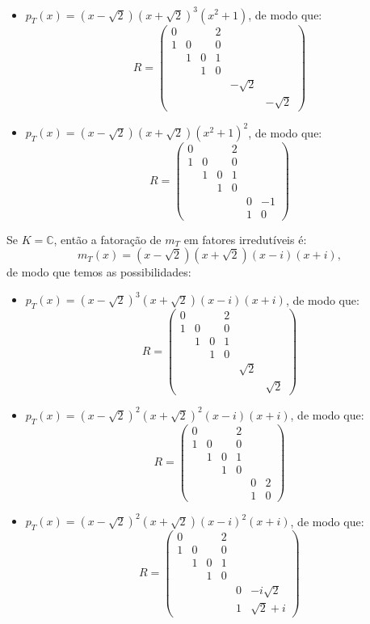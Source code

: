 \documentclass[11pt,a4paper]{article}
\begin{document}
{\begin{itemize}
\[\]
\item $p_T(x)=(x-\sqrt{2})(x+\sqrt{2})^3(x^2+1)$, de modo que:
\[
R=\begin{pmatrix}
0&&&2&&\\1&0&&0&&\\&1&0&1&&\\&&1&0&&\\&&&&-\sqrt{2}&\\&&&&&-\sqrt{2}
\end{pmatrix}
\]
\item $p_T(x)=(x-\sqrt{2})(x+\sqrt{2})(x^2+1)^2$, de modo que:
\[
R=\begin{pmatrix}
0&&&2&&\\1&0&&0&&\\&1&0&1&&\\&&1&0&&\\&&&&0&-1\\&&&&1&0
\end{pmatrix}
\]
\end{itemize}
\dividiritens{
\task[\pers{c}]} Se $K=\mathbb{C}$, então a fatoração de $m_T$ em fatores irredutíveis é:
\[
m_T(x)=(x-\sqrt{2})(x+\sqrt{2})(x-i)(x+i),
\]
de modo que temos as possibilidades:
\begin{itemize}
\item $p_T(x)=(x-\sqrt{2})^3(x+\sqrt{2})(x-i)(x+i)$, de modo que:
\[
R=\begin{pmatrix}
0&&&2&&\\1&0&&0&&\\&1&0&1&&\\&&1&0&&\\&&&&\sqrt{2}&\\&&&&&\sqrt{2}
\end{pmatrix}
\]
\item $p_T(x)=(x-\sqrt{2})^2(x+\sqrt{2})^2(x-i)(x+i)$, de modo que:
\[
R=\begin{pmatrix}
0&&&2&&\\1&0&&0&&\\&1&0&1&&\\&&1&0&&\\&&&&0&2\\&&&&1&0
\end{pmatrix}
\]
\item $p_T(x)=(x-\sqrt{2})^2(x+\sqrt{2})(x-i)^2(x+i)$, de modo que:
\[
R=\begin{pmatrix}
0&&&2&&\\1&0&&0&&\\&1&0&1&&\\&&1&0&&\\&&&&0&-i\sqrt{2}\\&&&&1&\sqrt{2}+i

\end{pmatrix}\]
\end{itemize}}
\end{document}
